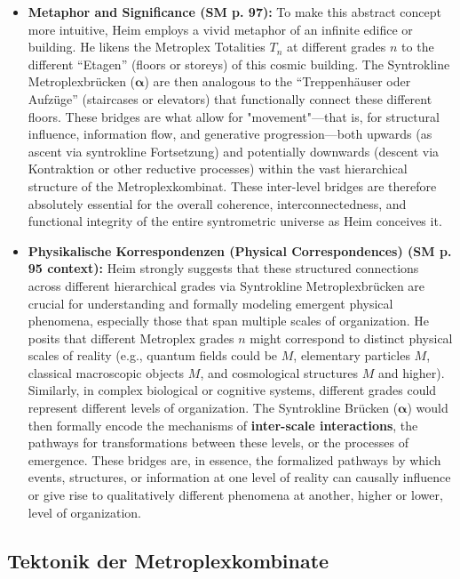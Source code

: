 \documentclass[12pt]{article}
\newcommand{\q}[1]{\enquote{#1}}
\def\metroplex#1#2{M}%
\newcommand{\metroplextotalitaet}[1]{T_{#1}}
\begin{document}
\begin{itemize}
    \item \textbf{Metaphor and Significance (SM p. 97):}
    To make this abstract concept more intuitive, Heim employs a vivid metaphor of an infinite edifice or building. He likens the Metroplex Totalities \( \metroplextotalitaet{n} \) at different grades \(n\) to the different \q{Etagen} (floors or storeys) of this cosmic building. The Syntrokline Metroplexbrücken (\( \bm{\alpha} \)) are then analogous to the \q{Treppenhäuser oder Aufzüge} (staircases or elevators) that functionally connect these different floors. These bridges are what allow for "movement"—that is, for structural influence, information flow, and generative progression—both upwards (as ascent via syntrokline Fortsetzung) and potentially downwards (descent via Kontraktion or other reductive processes) within the vast hierarchical structure of the Metroplexkombinat. These inter-level bridges are therefore absolutely essential for the overall coherence, interconnectedness, and functional integrity of the entire syntrometric universe as Heim conceives it.

    \item \textbf{Physikalische Korrespondenzen (Physical Correspondences) (SM p. 95 context):}
    Heim strongly suggests that these structured connections across different hierarchical grades via Syntrokline Metroplexbrücken are crucial for understanding and formally modeling emergent physical phenomena, especially those that span multiple scales of organization. He posits that different Metroplex grades \( n \) might correspond to distinct physical scales of reality (e.g., quantum fields could be \( \metroplex{1}{} \), elementary particles \( \metroplex{2}{} \), classical macroscopic objects \( \metroplex{3}{} \), and cosmological structures \( \metroplex{4}{} \) and higher). Similarly, in complex biological or cognitive systems, different grades could represent different levels of organization. The Syntrokline Brücken (\( \bm{\alpha} \)) would then formally encode the mechanisms of \textbf{inter-scale interactions}, the pathways for transformations between these levels, or the processes of emergence. These bridges are, in essence, the formalized pathways by which events, structures, or information at one level of reality can causally influence or give rise to qualitatively different phenomena at another, higher or lower, level of organization.
\end{itemize}

\subsection{Tektonik der Metroplexkombinate}
\label{sec:tektonik}
\end{document}
